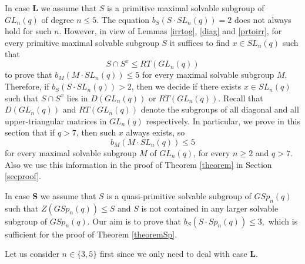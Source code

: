  In  case {\bf L}  we assume that $S$ is a  primitive maximal solvable subgroup of $GL_n(q)$ of  degree $n \le 5.$ The equation  $b_S(S \cdot SL_n(q))=2$ does not always hold for such $n$. However, in view of Lemmas %
\ref{irrtog}, \ref{diag}   and \ref{prtoirr}, for every primitive maximal  solvable subgroup $S$ it suffices  to find $x \in SL_n(q)$  such that
\begin{equation*}%
 S \cap S^x \le RT(GL_n(q))
\end{equation*}
 to prove that $b_M(M \cdot SL_n(q)) \le 5$ for every maximal solvable subgroup $M$.  Therefore, if $b_S(S \cdot SL_n(q))>2$, then we decide if there exists $x \in SL_n(q)$ such that  $S \cap S^x$ lies in $D(GL_n(q))$ or $RT(GL_n(q)).$ Recall that $D(GL_n(q))$ and $RT(GL_n(q))$ denote the subgroups of all diagonal and all upper-triangular matrices in $GL_n(q)$ respectively. In particular, we prove in this section that if $q>7$, then such $x$ always exists, so  $$b_M(M \cdot SL_n(q)) \le 5$$
for every maximal solvable subgroup $M$ of $GL_n(q)$, for every $n \ge 2$ and $q>7.$ Also we use this information in the proof of Theorem \ref{theorem} in Section \ref{secproof}.

In case {\bf S} we assume that $S$ is a quasi-primitive solvable subgroup of $GSp_n(q)$ such that $Z(GSp_n(q)) \le S$ and $S$ is not contained in any larger solvable subgroup of $GSp_n(q).$ Our aim is to prove that $b_S(S \cdot Sp_n(q)) \le 3,$ which is sufficient for the proof of Theorem \ref{theoremSp}.



Let us consider $n \in \{3,5\}$ first since %
 we only need to deal with  case {\bf L}.

\medskip


